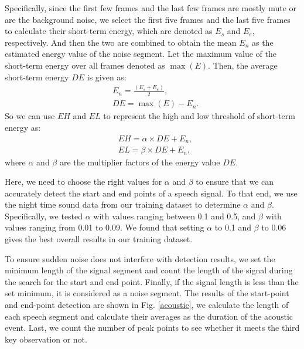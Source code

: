 Specifically, since the first few frames and the last few frames are mostly mute or are the background noise, we select the first five frames and the last five frames to calculate their short-term energy, which are denoted as $E_s$ and $E_e$, respectively. And then the two are combined to obtain the mean $E_n$ as the estimated energy value of the noise segment. Let the maximum value of the short-term energy over all frames denoted as $\max (E)$. Then, the average short-term energy $DE$ is given as:
\begin{eqnarray}
      &E_n = \frac{(E_s+E_e)}{2}, \\
      &DE = \max (E)-E_n.\label{eq:DE}
\end{eqnarray}
So we can use $EH$ and $EL$ to represent the high and low threshold of short-term energy as:
\begin{eqnarray}
      &EH=\alpha \times DE+E_n,\\
      &EL=\beta \times DE+E_n,
\end{eqnarray}
where $\alpha$ and $\beta$ are the multiplier factors of the energy value $DE$.


Here, we need to choose the right values for $\alpha$ and $\beta$ to ensure that we can accurately detect the start and end points of a speech signal. To that end, we use the night time sound data from our training dataset to determine $\alpha$ and $\beta$. Specifically, we tested $\alpha$ with values ranging between 0.1 and 0.5, and $\beta$ with values ranging from 0.01 to 0.09. We found that setting $\alpha$ to  0.1 and $\beta$ to  0.06 gives the best overall results in our training dataset.

To ensure sudden noise does not interfere with detection results, we set the minimum length of the signal segment and count the length of the signal during the search for the start and end point. Finally, if the signal length is less than the set minimum, it is considered as a noise segment. The results of the start-point and end-point detection are shown in Fig. \ref{acoustic}, we calculate the length of each speech segment and calculate their averages as the duration of the acoustic event. Last, we count the number of peak points to see whether it meets the third key observation or not.



